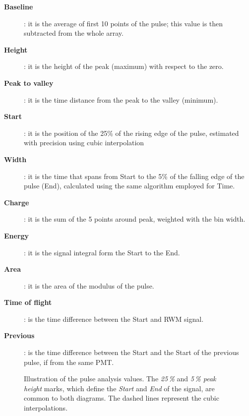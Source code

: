 \begin{description}
  \item[\bfseries Baseline]: it is the average of first 10 points of the pulse; %
    this value is then subtracted from the whole array.
  \item[\bfseries Height]: it is the height of the peak (maximum) with respect to the zero.
  \item[\bfseries Peak to valley]: it is the time distance from the peak to the valley (minimum).
  \item[\bfseries Start]: it is the position of the 25\% of the rising edge of the pulse, estimated with %
    precision using cubic interpolation
  \item[\bfseries Width]: it is the time that spans from Start to the 5\% of the falling edge %
    of the pulse (End), calculated using the same algorithm employed for Time.
  \item[\bfseries Charge]: it is the sum of the 5 points around peak, weighted with the bin width.
  \item[\bfseries Energy]: it is the signal integral form the Start to the End.
  \item[\bfseries Area]: it is the area of the modulus of the pulse.
  \item[\bfseries Time of flight]: is the time difference between the Start and RWM signal.
  \item[\bfseries Previous]: is the time difference between the Start and the Start of the previous pulse, %
    if from the same PMT.
\end{description}

\begin{figure}
  \centering
  \def\svgwidth{0.47\textwidth}
   \qquad
  \def\svgwidth{0.47\textwidth}
  \caption{Illustration of the pulse analysis values. The \emph{25\,\%} and \emph{5\,\% peak height} marks, %
  which define the \emph{Start} and \emph{End} of the signal, are common to both diagrams. The dashed lines represent %
  the cubic interpolations.}
  \label{fig:pulseana}
\end{figure}

